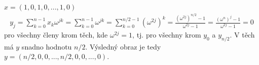\documentclass{scrartcl}
\begin{document}
\section{}
$x = (1,0,1,0,...,1,0)$
\begin{align*}
    y_j = \sum_{k=0}^{n-1} x_k \omega^{jk} = \sum_{k=0}^{n-1} \omega^{jk} = \sum_{k=0}^{n/2 -1} (\omega^{2j})^k = \frac{(\omega^{2j})^{n/2}-1}{\omega^{2j}-1} = \frac{(\omega^n)^j - 1}{\omega^{2j}-1} = 0 
\end{align*}
pro všechny členy krom těch, kde $\omega^{2j} = 1$, tj. pro všechny krom $y_0$ a $y_{n/2}$. V těch má $y$ snadno hodnotu $n/2$. Výsledný obraz je tedy $y = (n/2,0,0,...,n/2,0,0,...,0)$.  
\end{document}
